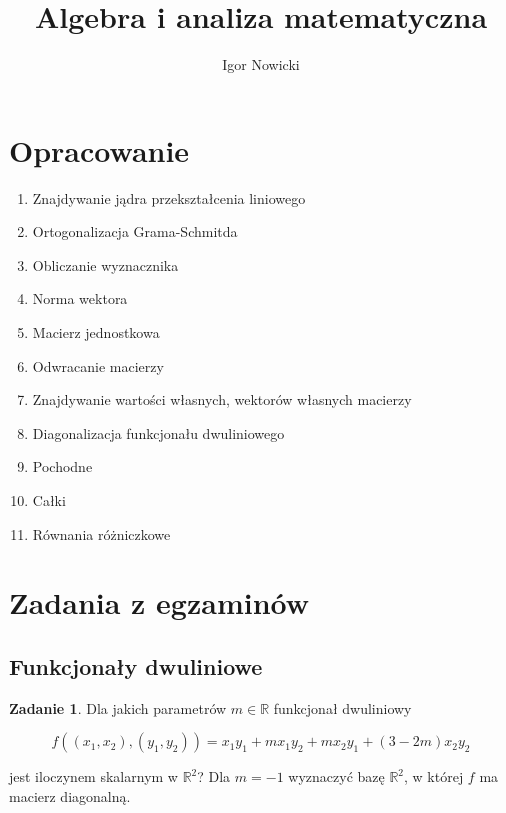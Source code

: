 \documentclass[11pt]{article}
\title{Algebra i analiza matematyczna}
\author{Igor Nowicki}
\theoremstyle{definition}
\newtheorem{zadanie}{Zadanie}
\begin{document}
\maketitle
\tableofcontents

\section{Opracowanie}

\begin{enumerate}
\item Znajdywanie jądra przekształcenia liniowego
\item Ortogonalizacja Grama-Schmitda
\item Obliczanie wyznacznika
\item Norma wektora
\item Macierz jednostkowa
\item Odwracanie macierzy
\item Znajdywanie wartości własnych, wektorów własnych macierzy
\item Diagonalizacja funkcjonału dwuliniowego
\item Pochodne
\item Całki
\item Równania różniczkowe
\end{enumerate}

\section{Zadania z egzaminów}

\subsection{Funkcjonały dwuliniowe}

\begin{zadanie}
    Dla jakich parametrów $m\in\mathbb R$ funkcjonał dwuliniowy

    $$f((x_1,x_2), (y_1,y_2)) = x_1y_1+mx_1y_2+mx_2y_1+(3-2m)x_2y_2$$

    jest iloczynem skalarnym w $\mathbb R^2$? Dla $m=-1$ wyznaczyć bazę $\mathbb R^2$, w której $f$ ma macierz diagonalną.
\end{zadanie}
\end{document}
